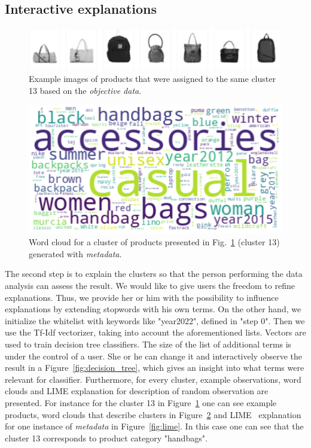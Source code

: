 \documentclass[
 twocolumn,
 hf,
]{ceurart}
\begin{document}
\subsection{Interactive explanations}\label{subsec:interactive-explanations}
\begin{figure}[h!]
  \centering
  \includegraphics[width=\linewidth]{example1-clustering-products-fashion-tex/output_62_22}
  \caption{Example images of products that were assigned to the same cluster 13 based on the \textit{objective data}.}
  \label{fig:example_products}
\end{figure}

\begin{figure}[h!]
  \centering
  \includegraphics[width=\linewidth]{example1-clustering-products-fashion-tex/output_62_23}
  \caption{Word cloud for a cluster of products presented in Fig.~\ref{fig:example_products} (cluster 13) generated with \textit{metadata}.}
  \label{fig:wordcloud}
\end{figure}

The second step is to explain the clusters so that the person performing the data analysis can assess the result.
We would like to give users the freedom to refine explanations.
Thus, we provide her or him with the possibility to influence explanations by extending stopwords with his own terms.
On the other hand, we initialize the whitelist with keywords like "year2022", defined in "step 0".
Then we use the Tf-Idf vectorizer, taking into account the aforementioned lists.
Vectors are used to train decision tree classifiers.
The size of the list of additional terms is under the control of a user.
She or he can change it and interactively observe the result in a Figure~\ref{fig:decision_tree}, which gives an insight into what terms were relevant for classifier.
Furthermore, for every cluster, example observations, word clouds and LIME explanation for description of random observation are presented.
For instance for the cluster 13 in Figure~\ref{fig:example_products} one can see example products, word clouds that describe clusters in Figure~\ref{fig:wordcloud} and LIME~\cite{lime} explanation for one instance of \textit{metadata} in Figure~\ref{fig:lime}.
In this case one can see that the cluster 13 corresponds to product category "handbags".
\end{document}
